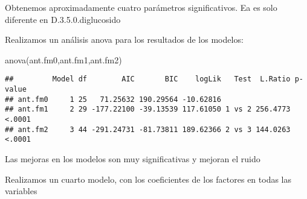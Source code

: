 \documentclass[
]{article}
\newenvironment{Shaded}{\begin{snugshade}}{\end{snugshade}}
\newcommand{\FunctionTok}[1]{\textcolor[rgb]{0.00,0.00,0.00}{#1}}
\newcommand{\NormalTok}[1]{#1}
\begin{document}
Obtenemos aproximadamente cuatro parámetros significativos. Ea es solo
diferente en D.3.5.0.diglucosido

Realizamos un análisis anova para los resultados de los modelos:

\begin{Shaded}
\begin{Highlighting}[]
\FunctionTok{anova}\NormalTok{(ant.fm0,ant.fm1,ant.fm2)}
\end{Highlighting}
\end{Shaded}

\begin{verbatim}
##         Model df        AIC       BIC    logLik   Test  L.Ratio p-value
## ant.fm0     1 25   71.25632 190.29564 -10.62816                        
## ant.fm1     2 29 -177.22100 -39.13539 117.61050 1 vs 2 256.4773  <.0001
## ant.fm2     3 44 -291.24731 -81.73811 189.62366 2 vs 3 144.0263  <.0001
\end{verbatim}

Las mejoras en los modelos son muy significativas y mejoran el ruido

Realizamos un cuarto modelo, con los coeficientes de los factores en
todas las variables
\end{document}
